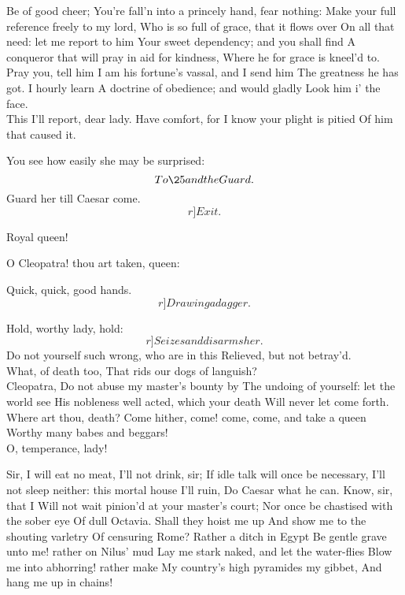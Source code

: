 \documentclass{book}
\begin{document}
	Be of good cheer;
	You're fall'n into a princely hand, fear nothing:
	Make your full reference freely to my lord,
	Who is so full of grace, that it flows over
	On all that need: let me report to him
	Your sweet dependency; and you shall find
	A conqueror that will pray in aid for kindness,
	Where he for grace is kneel'd to. \\

\2	Pray you, tell him
	I am his fortune's vassal, and I send him
	The greatness he has got. I hourly learn
	A doctrine of obedience; and would gladly
	Look him i' the face. \\

	This I'll report, dear lady.
	Have comfort, for I know your plight is pitied
	Of him that caused it. 

	You see how easily she may be surprised:
	\[To \25 and the Guard.\] Guard her till Caesar come. \[r]Exit.\]

	Royal queen!

\7	O Cleopatra! thou art taken, queen:

\2	Quick, quick, good hands. \\	\[r]Drawing a dagger.\]

	Hold, worthy lady, hold:
	   \[r]Seizes and disarms her.\]
	Do not yourself such wrong, who are in this
	Relieved, but not betray'd. \\

\2	What, of death too,
	That rids our dogs of languish? \\

	Cleopatra,
	Do not abuse my master's bounty by
	The undoing of yourself: let the world see
	His nobleness well acted, which your death
	Will never let come forth. \\

\2	Where art thou, death?
	Come hither, come! come, come, and take a queen
	Worthy many babes and beggars! \\

	O, temperance, lady!

\2	Sir, I will eat no meat, I'll not drink, sir;
	If idle talk will once be necessary,
	I'll not sleep neither: this mortal house I'll ruin,
	Do Caesar what he can. Know, sir, that I
	Will not wait pinion'd at your master's court;
	Nor once be chastised with the sober eye
	Of dull Octavia. Shall they hoist me up
	And show me to the shouting varletry
	Of censuring Rome? Rather a ditch in Egypt
	Be gentle grave unto me! rather on Nilus' mud
	Lay me stark naked, and let the water-flies
	Blow me into abhorring! rather make
	My country's high pyramides my gibbet,
	And hang me up in chains! \\
\end{document}
